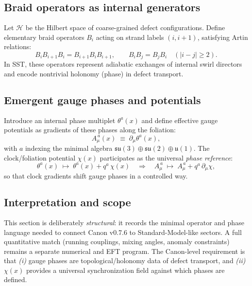\documentclass[10pt]{article}
\begin{document}
\subsection{Braid operators as internal generators}

Let $\mathcal{H}$ be the Hilbert space of coarse-grained defect configurations.
Define elementary braid operators $B_i$ acting on strand labels $(i,i+1)$,
satisfying Artin relations:
\begin{equation}
    B_i B_{i+1} B_i = B_{i+1} B_i B_{i+1},
    \qquad
    B_i B_j = B_j B_i \quad (|i-j|\ge 2).
\end{equation}
In SST, these operators represent adiabatic exchanges of internal swirl directors
and encode nontrivial holonomy (phase) in defect transport.

\subsection{Emergent gauge phases and potentials}

Introduce an internal phase multiplet $\theta^a(x)$ and define effective gauge
potentials as gradients of these phases along the foliation:
\begin{equation}
    A_\mu^{\,a}(x) \;\equiv\; \partial_\mu \theta^a(x),
\end{equation}
with $a$ indexing the minimal algebra
$\mathfrak{su}(3)\oplus\mathfrak{su}(2)\oplus\mathfrak{u}(1)$.
The clock/foliation potential $\chi(x)$ participates as the universal
\emph{phase reference}:
\begin{equation}
    \theta^a(x) \;\mapsto\; \theta^a(x) + q^a\,\chi(x)
    \quad\Rightarrow\quad
    A_\mu^{\,a} \;\mapsto\; A_\mu^{\,a} + q^a\,\partial_\mu \chi,
\end{equation}
so that clock gradients shift gauge phases in a controlled way.

\subsection{Interpretation and scope}

This section is deliberately \emph{structural}: it records the minimal operator
and phase language needed to connect Canon v0.7.6 to Standard-Model-like sectors.
A full quantitative match (running couplings, mixing angles, anomaly constraints)
remains a separate numerical and EFT program. The Canon-level requirement is that
\emph{(i)} gauge phases are topological/holonomy data of defect transport,
and \emph{(ii)} $\chi(x)$ provides a universal synchronization field against which
phases are defined.
\end{document}
